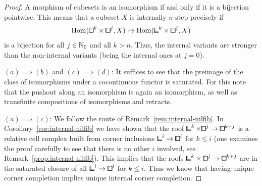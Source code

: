 \begin{proof}
	A morphism of cubesets is an isomorphism if and only if it is a bijection pointwise.
	This means that a cubeset $X$ is internally $n$-step precisely if
    \[
        \hom({\bbox}^k\times{\bbox}^j,X)\to\hom({\bbcor}^k\times{\bbox}^j,X)
    \]
	is a bijection for all $j\in {\mathbb{N}}_0$ and all $k>n$.
	Thus, the internal variants are stronger than the non-internal variants (being the internal ones at $j=0$).

	$(a)\implies(b)$ and $(c)\implies(d)$: It suffices to see that the preimage of the class of isomorphisms under a cocontinuous functor is saturated.
	For this note that the pushout along an isomorphism is again an isomorphism,
	as well as transfinite compositions of isomorphisms and retracts.

    $(a)\implies(c)$:
	We follow the route of Remark~\ref{rem:internal-nilfib}.
	In Corollary~\ref{cor:internal-nilfib} we have shown that the roof $\bbcor^{k}\times{\bbox}^j\to{\bbox}^{k+j}$
	is a relative cell complex built from corner inclusions ${\bbcor}^i\to{\bbox}^i$ for $k\le i$
	(one examines the proof carefully to see that there is no other $i$ involved, see Remark~\ref{prop:internal-nilfib}).
	This implies that the roofs ${\bbcor}^k\times{\bbox}^j\to{\bbox}^{k+j}$
	are in the saturated closure of all ${\bbcor}^i\to{\bbox}^i$ for $k\le i$.
	Thus we know that having unique corner completion implies unique internal corner completion.


\end{proof}
